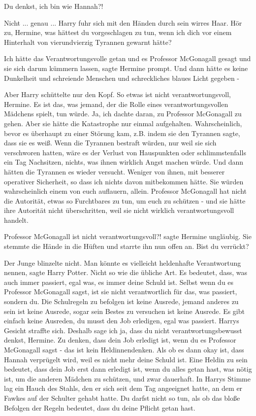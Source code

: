 \glqq Du denkst, ich bin wie Hannah?!\grqq{}

\glqq Nicht ... genau ...\grqq{} Harry fuhr sich mit den Händen durch sein
wirres Haar. \glqq Hör zu, Hermine, was hättest du vorgeschlagen zu tun, wenn
ich dich vor einem Hinterhalt von vierundvierzig Tyrannen gewarnt hätte?\grqq{}

\glqq Ich hätte das Verantwortungsvolle getan und es Professor McGonagall gesagt
und sie sich darum kümmern lassen\grqq{}, sagte Hermine prompt. \glqq Und dann
hätte es keine Dunkelheit und schreiende Menschen und schreckliches blaues Licht
gegeben -\grqq{}

Aber Harry schüttelte nur den Kopf. \glqq So etwas ist nicht verantwortungsvoll,
Hermine. Es ist das, was jemand, der die Rolle eines verantwortungsvollen
Mädchens spielt, tun würde. Ja, ich dachte daran, zu Professor McGonagall zu
gehen. Aber sie hätte die Katastrophe nur einmal aufgehalten. Wahrscheinlich,
bevor es überhaupt zu einer Störung kam, z.B. indem sie den Tyrannen sagte, dass
sie es weiß. Wenn die Tyrannen bestraft würden, nur weil sie sich verschworen
hatten, wäre es der Verlust von Hauspunkten oder schlimmstenfalls ein Tag
Nachsitzen, nichts, was ihnen wirklich Angst machen würde. Und dann hätten die
Tyrannen es wieder versucht. Weniger von ihnen, mit besserer operativer
Sicherheit, so dass ich nichts davon mitbekommen hätte. Sie würden
wahrscheinlich einem von euch auflauern, allein. Professor McGonagall hat nicht
die Autorität, etwas so Furchtbares zu tun, um euch zu schützen - und sie hätte
ihre Autorität nicht überschritten, weil sie nicht wirklich verantwortungsvoll
handelt.\grqq{}

\glqq Professor McGonagall ist nicht verantwortungsvoll?!\grqq{} sagte Hermine
ungläubig. Sie stemmte die Hände in die Hüften und starrte ihn nun offen an.
\glqq Bist du verrückt?\grqq{}

Der Junge blinzelte nicht. \glqq Man könnte es vielleicht heldenhafte
Verantwortung nennen\grqq{}, sagte Harry Potter. \glqq Nicht so wie die übliche
Art. Es bedeutet, dass, was auch immer passiert, egal was, es immer deine Schuld
ist. Selbst wenn du es Professor McGonagall sagst, ist sie nicht verantwortlich
für das, was passiert, sondern du. Die Schulregeln zu befolgen ist keine
Ausrede, jemand anderes zu sein ist keine Ausrede, sogar sein Bestes zu
versuchen ist keine Ausrede. Es gibt einfach keine Ausreden, du musst den Job
erledigen, egal was passiert.\grqq{} Harrys Gesicht straffte sich. \glqq Deshalb
sage ich ja, dass du nicht verantwortungsbewusst denkst, Hermine. Zu denken,
dass dein Job erledigt ist, wenn du es Professor McGonagall sagst - das ist kein
Heldinnendenken. Als ob es dann okay ist, dass Hannah verprügelt wird, weil es
nicht mehr deine Schuld ist. Eine Heldin zu sein bedeutet, dass dein Job erst
dann erledigt ist, wenn du alles getan hast, was nötig ist, um die anderen
Mädchen zu schützen, und zwar dauerhaft.\grqq{} In Harrys Stimme lag ein Hauch
des Stahls, den er sich seit dem Tag angeeignet hatte, an dem er Fawkes auf der
Schulter gehabt hatte. \glqq Du darfst nicht so tun, als ob das bloße Befolgen
der Regeln bedeutet, dass du deine Pflicht getan hast.\grqq{}

